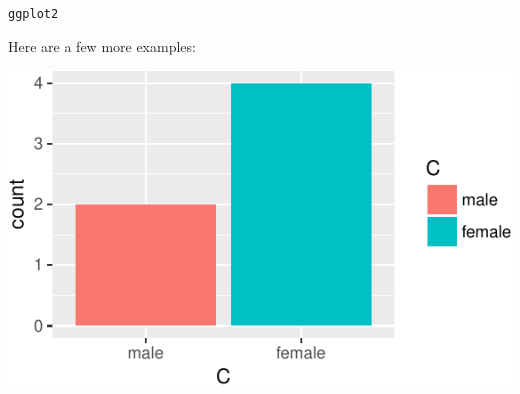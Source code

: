 \begin{frame}[fragile]{\texttt{ggplot2}}

Here are a few more examples:

\begin{Shaded}
\begin{Highlighting}[]
\NormalTok{(}\OperatorTok{+}
\StringTok{  }\NormalTok{(}\NormalTok{, }\NormalTok{(}
\end{Highlighting}
\end{Shaded}

\includegraphics{03_UnderstandData_files/figure-beamer/unnamed-chunk-12-1.pdf}

\end{frame}

